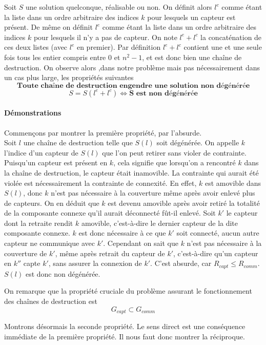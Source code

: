 \documentclass[12pt,a4paper]{article}
\begin{document}
Soit $S$ une solution quelconque, réalisable ou non. On définit alors $l^c$ comme étant la liste dans un ordre arbitraire des indices $k$ pour lesquels un capteur est présent. De même on définit $l^e$ comme étant la liste dans un ordre arbitraire des indices $k$ pour lesquels il n'y a pas de capteur. On note $l^e+l^c$ la concaténation de ces deux listes (avec $l^e$ en premier). Par définition $l^e+l^c$ contient une et une seule fois tous les entier compris entre $0$ et $n^2-1$, et est donc bien une chaîne de destruction. On observe alors ,dans notre problème mais pas nécessairement dans un cas plus large, les propriétés suivantes
\[\textbf{Toute chaîne de destruction engendre une solution non dégénérée}\]
\[S=S(l^e+l^c) \Leftrightarrow \textbf{S est non dégénérée}\]
\paragraph{Démonstrations}
Commençons par montrer la première propriété, par l'absurde. 
\\Soit $l$ une chaîne de destruction telle que $S(l)$ soit dégénérée. On appelle $k$ l'indice d'un capteur de $S(l)$ que l'on peut retirer sans violer de contrainte. Puisqu'un capteur est présent en $k$, cela signifie que lorsqu'on a rencontré $k$ dans la chaîne de destruction, le capteur était inamovible. La contrainte qui aurait été violée est nécessairement la contrainte de connexité. En effet, $k$ est amovible dans $S(l)$, donc $k$ n'est pas nécessaire à la couverture même après avoir enlevé plus de capteurs. On en déduit que $k$ est devenu amovible après avoir retiré la totalité de la composante connexe qu'il aurait déconnecté fût-il enlevé. Soit $k'$ le capteur dont la retraite rendit $k$ amovible, c'est-à-dire le dernier capteur de la dite composante connexe. $k$ est donc nécessaire à ce que $k'$ soit connecté, aucun autre capteur ne communique avec $k'$. Cependant on sait que $k$ n'est pas nécessaire à la couverture de $k'$, même après retrait du capteur de $k'$, c'est-à-dire qu'un capteur en $k''$ capte $k'$, sans assurer la connexion de $k'$. C'est absurde, car $R_{capt}\leq R_{comm}$. $S(l)$ est donc non dégénérée.

On remarque que la propriété cruciale du problème assurant le fonctionnement des chaînes de destruction est 
\[G_{capt}\subset G_{comm}\]

Montrons désormais la seconde propriété. Le sens direct est une conséquence immédiate de la première propriété. Il nous faut donc montrer la réciproque.
\end{document}
